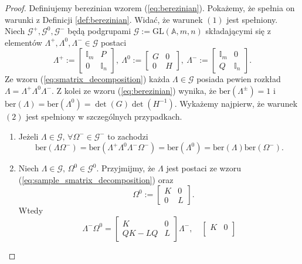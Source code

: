 \documentclass[11pt,a4paper]{report}
\theoremstyle{definition}
\newcommand{\ber}{\mathrm{ber}}
\newcommand{\I}{\mathbb{I}}
\begin{document}
\begin{proof}
Definiujemy berezinian wzorem (\ref{eq:berezinian}). Pokażemy, że spełnia on warunki z Definicji \ref{def:berezinian}. Widać, że warunek $(1)$ jest spełniony. Niech $\mathcal{G}^{+}, \mathcal{G}^{0}, \mathcal{G}^{-}$ będą podgrupami $\mathcal{G}:=\mathrm{GL}(\mathbb{A},m,n)$ składającymi się z elementów $\Lambda^{+}, \Lambda^{0}, \Lambda^{-} \in \mathcal{G}$ postaci
\begin{equation}
\label{eq:sample_smatrix_decomposition}
 \Lambda^{+} := \begin{bmatrix}
     \I_m & P \\
      0 & \I_n
     \end{bmatrix}\!\!,\
 \Lambda^{0} := \begin{bmatrix}
      G & 0 \\
      0 & H
     \end{bmatrix}\!\!,\
 \Lambda^{-} := \begin{bmatrix}
     \I_m & 0 \\
      Q & \I_n
     \end{bmatrix}\!\!.
\end{equation}
Ze wzoru (\ref{eq:smatrix_decomposition}) każda $\Lambda \in \mathcal{G}$ posiada pewien rozkład $\Lambda = \Lambda^{+} \Lambda^0 \Lambda^{-}$. Z kolei ze wzoru (\ref{eq:berezinian}) wynika, że $\ber(\Lambda^{\pm})=1$ i $\ber(\Lambda) = \ber(\Lambda^0) = \det (G) \det (H^{-1})$. Wykażemy najpierw, że warunek $(2)$ jest spełniony w szczególnych przypadkach.
\begin{enumerate}[1)]
 \item Jeżeli $\Lambda \in \mathcal{G},\, \forall \Omega^{-} \in \mathcal{G}^{-}$ to zachodzi $$\ber (\Lambda \Omega^{-}) = \ber(\Lambda^{+} \Lambda^0 \Lambda^{-} \Omega^{-}) = \ber (\Lambda^0) = \ber(\Lambda) \ber(\Omega^{-}).$$
 \item Niech $\Lambda \in \mathcal{G},\, \Omega^0 \in \mathcal{G}^0$. Przyjmijmy, że $\Lambda$ jest postaci ze wzoru (\ref{eq:sample_smatrix_decomposition}) oraz $$\quad \Omega^0 := \begin{bmatrix}
     K & 0 \\
     0 & L 
     \end{bmatrix}\!.$$ Wtedy $$\Lambda^- \Omega^0 = \begin{bmatrix}
     K & 0 \\
     QK - LQ & L 
     \end{bmatrix} \Lambda^-, \quad \begin{bmatrix}
     K & 0 \\

\end{bmatrix}$$
\end{enumerate}
\end{proof}
\end{document}
